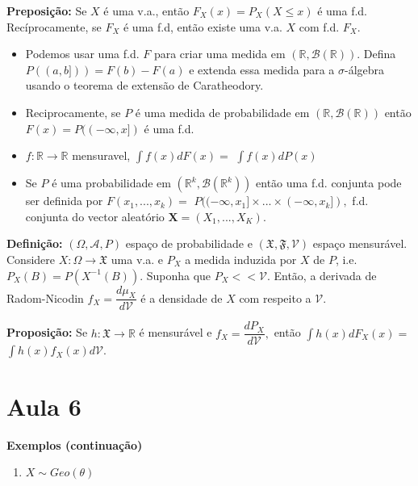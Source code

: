 \documentclass[
]{book}
\providecommand{\tightlist}{%
  \setlength{\itemsep}{0pt}\setlength{\parskip}{0pt}}
\begin{document}
\textbf{Preposição:} Se \(X\) é uma v.a., então \(F_X(x)=P_X(X\leq x)\) é uma f.d. Recíprocamente, se \(F_X\) é uma f.d, então existe uma v.a. \(X\) com f.d. \(F_X.\)

\begin{itemize}
\item
  Podemos usar uma f.d. \(F\) para criar uma medida em \((\mathbb{R},\mathcal{B}(\mathbb{R})).\) Defina \(P((a,b]))=F(b)-F(a)\) e extenda essa medida para a \(\sigma\)-álgebra usando o teorema de extensão de Caratheodory.
\item
  Reciprocamente, se \(P\) é uma medida de probabilidade em \((\mathbb{R},\mathcal{B}(\mathbb{R}))\) então \(F(x)=P((-\infty,x])\) é uma f.d.
\item
  \(f: \mathbb{R}\longrightarrow \mathbb{R}\) mensuravel, \(\int f(x)dF(x)=\) \(\int f(x)dP(x)\)
\item
  Se \(P\)
  é uma probabilidade em \((\mathbb{R}^k,\mathcal{B}(\mathbb{R}^k))\) então uma f.d. conjunta pode ser definida por \(F(x_1,...,x_k)=\) \(P((-\infty,x_1]\times ...\times (-\infty,x_k]),\) f.d. conjunta do vector aleatório \(\boldsymbol{X} = (X_1,...,X_K).\)
\end{itemize}

\textbf{Definição:} \((\Omega, \mathcal{A}, P)\) espaço de probabilidade e \((\mathfrak{X},\mathfrak{F},\mathcal{V})\) espaço mensurável. Considere \(X: \Omega \longrightarrow \mathfrak{X}\) uma v.a. e \(P_X\) a medida induzida por \(X\) de \(P\), i.e.~\(P_X(B) = P(X^{-1}(B)).\) Suponha que \(P_X << \mathcal{V}\). Então, a derivada de Radom-Nicodin \(f_X = \dfrac{d\mu_X}{d\mathcal{V}}\) é a densidade de \(X\) com respeito a \(\mathcal{V}\).

\textbf{Proposição:} Se \(h: \mathfrak{X}\longrightarrow\mathbb{R}\) é mensurável e \(f_X = \dfrac{dP_X}{d\mathcal{V}},\) então \(\int h(x)dF_X(x)=\) \(\int h(x)f_X(x)d\mathcal{V}.\)

\hypertarget{aula-6}{%
\section{Aula 6}\label{aula-6}}

\textbf{Exemplos (continuação)}

\begin{enumerate}
\def\labelenumi{\arabic{enumi}.}
\setcounter{enumi}{3}
\tightlist
\item
  \(X \sim Geo(\theta)\)
\end{enumerate}
\end{document}

